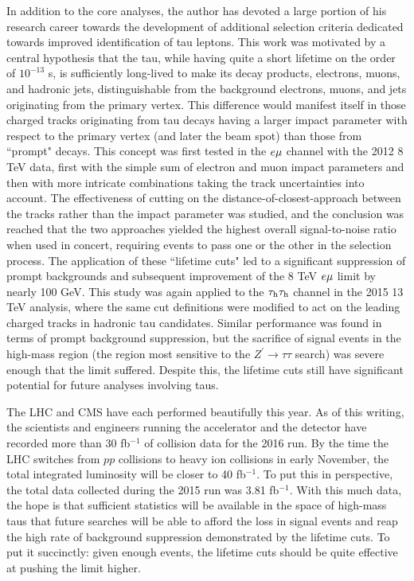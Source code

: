 In addition to the core analyses, the author has devoted a large portion of his research career towards the development of additional selection criteria dedicated towards improved identification of tau leptons. This work was motivated by a central hypothesis that the tau, while having quite a short lifetime on the order of $10^{-13}$ s, is sufficiently long-lived to make its decay products, electrons, muons, and hadronic jets, distinguishable from the background electrons, muons, and jets originating from the primary vertex. This difference would manifest itself in those charged tracks originating from tau decays having a larger impact parameter with respect to the primary vertex (and later the beam spot) than those from ``prompt" decays. This concept was first tested in the $e\mu$ channel with the 2012 8 TeV data, first with the simple sum of electron and muon impact parameters and then with more intricate combinations taking the track uncertainties into account. The effectiveness of cutting on the distance-of-closest-approach between the tracks rather than the impact parameter was studied, and the conclusion was reached that the two approaches yielded the highest overall signal-to-noise ratio when used in concert, requiring events to pass one or the other in the selection process. The application of these ``lifetime cuts" led to a significant suppression of prompt backgrounds and subsequent improvement of the 8 TeV $e\mu$ limit by nearly 100 GeV. This study was again applied to the $\tau_{\textrm{h}}\tau_{\textrm{h}}$ channel in the 2015 13 TeV analysis, where the same cut definitions were modified to act on the leading charged tracks in hadronic tau candidates. Similar performance was found in terms of prompt background suppression, but the sacrifice of signal events in the high-mass region (the region most sensitive to the $Z^\prime\to\tau\tau$ search) was severe enough that the limit suffered. Despite this, the lifetime cuts still have significant potential for future analyses involving taus.

The LHC and CMS have each performed beautifully this year. As of this writing, the scientists and engineers running the accelerator and the detector have recorded more than 30 fb$^{-1}$ of collision data for the 2016 run. By the time the LHC switches from $pp$ collisions to heavy ion collisions in early November, the total integrated luminosity will be closer to 40 fb$^{-1}$\cite{CMSLumi}. To put this in perspective, the total data collected during the 2015 run was 3.81 fb$^{-1}$. With this much data, the hope is that sufficient statistics will be available in the space of high-mass taus that future searches will be able to afford the loss in signal events and reap the high rate of background suppression demonstrated by the lifetime cuts. To put it succinctly: given enough events, the lifetime cuts should be quite effective at pushing the limit higher.

